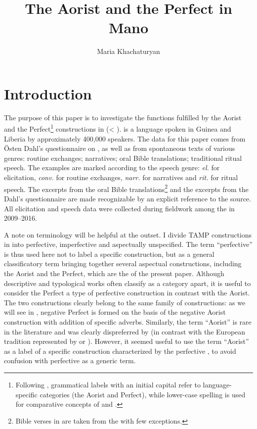 \documentclass[output=paper,newtxmath,modfonts,nonflat,hidelinks]{langsci/langscibook}
\author{Maria Khachaturyan\affiliation{University of Helsinki}}
\title{The Aorist and the Perfect in Mano}
\begin{document}
\maketitle

\section{Introduction} %
The purpose of this paper is to investigate the functions fulfilled by the Aorist and the Perfect\footnote{Following \citet{khachhasp}, grammatical labels with an initial capital refer to language-specific categories (the  Aorist and Perfect), while lower-case spelling is used for comparative concepts of  and .} constructions in  (< ).  is a  language spoken in Guinea and Liberia by approximately 400,000 speakers. The data for this paper comes from Östen Dahl’s questionnaire on  \citep{khachdahl2000}, as well as from spontaneous texts of various genres: routine exchanges; narratives; oral Bible translations; traditional ritual speech. The examples are marked according to the speech genre: \textit{el.} for elicitation, \textit{conv.} for routine exchanges, \textit{narr.} for narratives and \textit{rit.} for ritual speech. The excerpts from the oral Bible translations\footnote{Bible verses in  are taken from the \citealt{khachNIV} with few exceptions.} and the excerpts from the Dahl's questionnaire are made recognizable by an explicit reference to the source. All elicitation and speech data were collected during fieldwork among the  in 2009--2016.

A note on terminology will be helpful at the outset. I divide TAMP constructions in  into perfective, imperfective and aspectually unspecified. The term ``perfective'' is thus used here not to label a specific construction, but as a general classificatory term bringing together several aspectual constructions, including the Aorist and the Perfect, which are the  of the present paper. Although descriptive and typological works often classify  as a category apart, it is useful to consider the  Perfect a type of perfective construction in contrast with the Aorist. The two constructions clearly belong to the same family of constructions: as we will see in , negative Perfect is formed on the basis of the negative Aorist construction with addition of specific adverbs. Similarly, the term ``Aorist'' is rare in the literature and was clearly dispreferred by \citet{khachcomrie1976} (in contrast with the European tradition represented by \citet{khachplung2016} or \citet{khachmaisak2016}). However, it seemed useful to use the term ``Aorist'' as a label of a specific construction characterized by the perfective , to avoid confusion with perfective as a generic term. 
\end{document}
